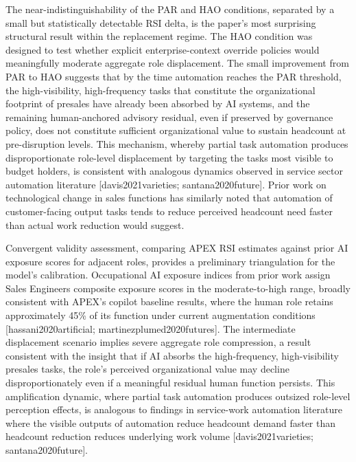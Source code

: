 \documentclass[10pt, conference]{IEEEtran}
\begin{document}
The near-indistinguishability of the PAR and HAO conditions, separated by a small but statistically detectable RSI delta, is the paper's most surprising structural result within the replacement regime. The HAO condition was designed to test whether explicit enterprise-context override policies would meaningfully moderate aggregate role displacement. The small improvement from PAR to HAO suggests that by the time automation reaches the PAR threshold, the high-visibility, high-frequency tasks that constitute the organizational footprint of presales have already been absorbed by AI systems, and the remaining human-anchored advisory residual, even if preserved by governance policy, does not constitute sufficient organizational value to sustain headcount at pre-disruption levels. This mechanism, whereby partial task automation produces disproportionate role-level displacement by targeting the tasks most visible to budget holders, is consistent with analogous dynamics observed in service sector automation literature [davis2021varieties; santana2020future]. Prior work on technological change in sales functions \cite{groene2024introduction} has similarly noted that automation of customer-facing output tasks tends to reduce perceived headcount need faster than actual work reduction would suggest.

Convergent validity assessment, comparing APEX RSI estimates against prior AI exposure scores for adjacent roles, provides a preliminary triangulation for the model's calibration. Occupational AI exposure indices from prior work assign Sales Engineers composite exposure scores in the moderate-to-high range, broadly consistent with APEX's copilot baseline results, where the human role retains approximately 45\% of its function under current augmentation conditions [hassani2020artificial; martinezplumed2020futures]. The intermediate displacement scenario implies severe aggregate role compression, a result consistent with the insight that if AI absorbs the high-frequency, high-visibility presales tasks, the role's perceived organizational value may decline disproportionately even if a meaningful residual human function persists. This amplification dynamic, where partial task automation produces outsized role-level perception effects, is analogous to findings in service-work automation literature where the visible outputs of automation reduce headcount demand faster than headcount reduction reduces underlying work volume [davis2021varieties; santana2020future].
\end{document}
